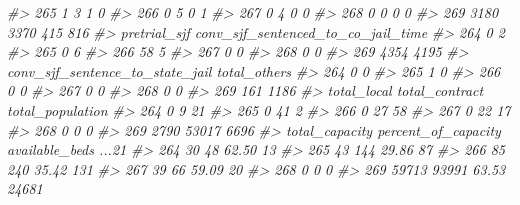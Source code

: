 \documentclass[
]{krantz}
\makeatletter
\newenvironment{Shaded}{\begin{snugshade}}{\end{snugshade}}
\newcommand{\CommentTok}[1]{\textcolor[rgb]{0.37,0.37,0.37}{\textit{#1}}}
\newenvironment{kframe}{%
\medskip{}
\setlength{\fboxsep}{.8em}
 \def\at@end@of@kframe{}%
 \ifinner\ifhmode%
  \def\at@end@of@kframe{\end{minipage}}%
  \begin{minipage}{\columnwidth}%
 \fi\fi%
 \def\FrameCommand##1{\hskip\@totalleftmargin \hskip-\fboxsep
 \colorbox{shadecolor}{##1}\hskip-\fboxsep
     \hskip-\linewidth \hskip-\@totalleftmargin \hskip\columnwidth}%
 \MakeFramed {\advance\hsize-\width
   \@totalleftmargin\z@ \linewidth\hsize
   \@setminipage}}%
 {\par\unskip\endMakeFramed%
 \at@end@of@kframe}
\renewenvironment{Shaded}{\begin{kframe}}{\end{kframe}}
\makeatother
\begin{document}
\begin{Shaded}
\begin{Highlighting}[]
\CommentTok{\#\textgreater{} 265             1         3              1       0}
\CommentTok{\#\textgreater{} 266             0         5              0       1}
\CommentTok{\#\textgreater{} 267             0         4              0       0}
\CommentTok{\#\textgreater{} 268             0         0              0       0}
\CommentTok{\#\textgreater{} 269          3180      3370            415     816}
\CommentTok{\#\textgreater{}     pretrial\_sjf conv\_sjf\_sentenced\_to\_co\_jail\_time}
\CommentTok{\#\textgreater{} 264            0                                  2}
\CommentTok{\#\textgreater{} 265            0                                  6}
\CommentTok{\#\textgreater{} 266           58                                  5}
\CommentTok{\#\textgreater{} 267            0                                  0}
\CommentTok{\#\textgreater{} 268            0                                  0}
\CommentTok{\#\textgreater{} 269         4354                               4195}
\CommentTok{\#\textgreater{}     conv\_sjf\_sentence\_to\_state\_jail total\_others}
\CommentTok{\#\textgreater{} 264                               0            0}
\CommentTok{\#\textgreater{} 265                               1            0}
\CommentTok{\#\textgreater{} 266                               0            0}
\CommentTok{\#\textgreater{} 267                               0            0}
\CommentTok{\#\textgreater{} 268                               0            0}
\CommentTok{\#\textgreater{} 269                             161         1186}
\CommentTok{\#\textgreater{}     total\_local total\_contract total\_population}
\CommentTok{\#\textgreater{} 264           0              9               21}
\CommentTok{\#\textgreater{} 265           0             41                2}
\CommentTok{\#\textgreater{} 266           0             27               58}
\CommentTok{\#\textgreater{} 267           0             22               17}
\CommentTok{\#\textgreater{} 268           0              0                0}
\CommentTok{\#\textgreater{} 269        2790          53017             6696}
\CommentTok{\#\textgreater{}     total\_capacity percent\_of\_capacity available\_beds ...21}
\CommentTok{\#\textgreater{} 264             30                  48          62.50    13}
\CommentTok{\#\textgreater{} 265             43                 144          29.86    87}
\CommentTok{\#\textgreater{} 266             85                 240          35.42   131}
\CommentTok{\#\textgreater{} 267             39                  66          59.09    20}
\CommentTok{\#\textgreater{} 268              0                   0                    0}
\CommentTok{\#\textgreater{} 269          59713               93991          63.53 24681}
\end{Highlighting}
\end{Shaded}
\end{document}
